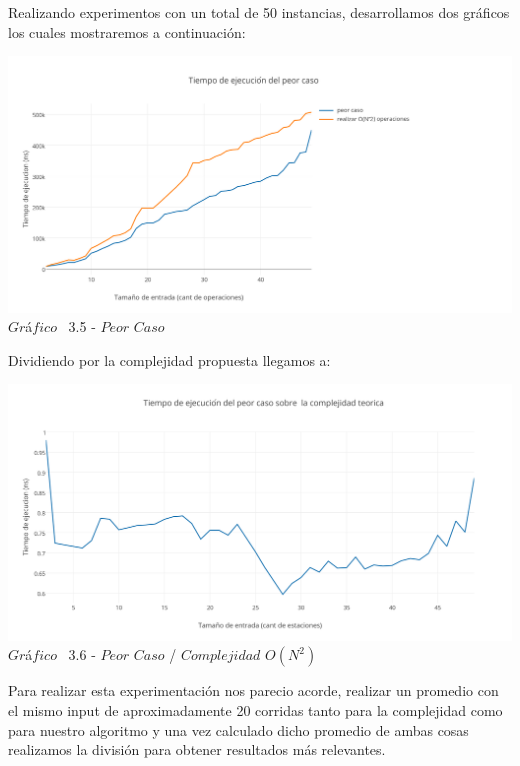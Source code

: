 Realizando experimentos con un total de 50 instancias, desarrollamos dos gr\'aficos los cuales mostraremos a continuaci\'on: \\

\vspace*{0.3cm} \vspace*{0.3cm}
  \begin{center}
 \includegraphics[scale=0.65]{./EJ3/peorcaso.png}
 {$Gr$\'a$fico$ \ 3.5 - $Peor$ $Caso$}
  \end{center}
  \vspace*{0.3cm}


Dividiendo por la complejidad propuesta llegamos a:\\

\vspace*{0.3cm} \vspace*{0.3cm}
  \begin{center}
 \includegraphics[scale=0.65]{./EJ3/peorcaso1.png}
 {$Gr$\'a$fico$ \ 3.6 - $Peor$ $Caso$ / $Complejidad$ $O(N^2)$}
  \end{center}
  \vspace*{0.3cm}

Para realizar esta experimentaci\'on nos parecio acorde, realizar un promedio con el mismo input de aproximadamente 20 corridas
tanto para la complejidad como para nuestro algoritmo y una vez calculado dicho promedio de ambas cosas realizamos la divisi\'on para
obtener resultados m\'as relevantes.\\ 

